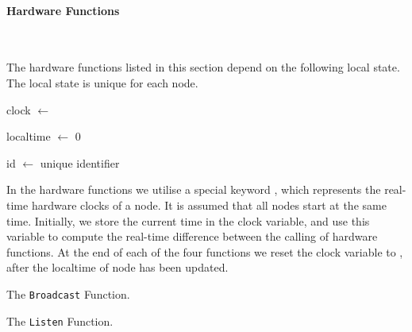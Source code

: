 
\paragraph{Hardware Functions}\label{sec:hwfuncspseudo} \

The hardware functions listed in this section depend on the following local state. The local state is unique for each node.\smallbreak

clock $\leftarrow$ \KwNow

localtime $\leftarrow$ 0

id $\leftarrow$ unique identifier \smallbreak

In the hardware functions we utilise a special keyword \singlequote{\KwNow}, which represents the real-time hardware clocks of a node. It is assumed that all nodes start at the same time. Initially, we store the current time in the clock variable, and use this variable to compute the real-time difference between the calling of hardware functions. At the end of each of the four functions we reset the clock variable to \singlequote{\KwNow}, after the localtime of node has been updated.\medbreak

\begin{algorithm}[ht]
    \DontPrintSemicolon
    

    \caption{The \texttt{Broadcast} Function.}
    \label{algo:hwfuncstransmit}
\end{algorithm}

\begin{algorithm}[ht]
    \DontPrintSemicolon
    
    
    \caption{The \texttt{Listen} Function.}
    \label{algo:hwfuncslisten}
\end{algorithm}

